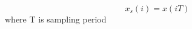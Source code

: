 \documentclass[preview]{standalone}
\begin{document}
\begin{center}
\[ x_s(i) = x(i T)\]  where T is sampling period
\end{center}
\end{document}
